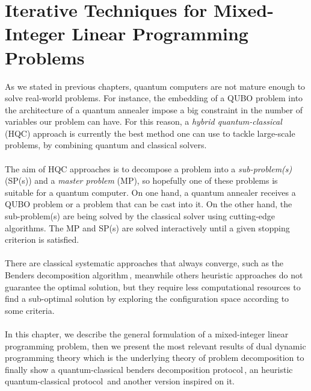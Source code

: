 
\chapter{Iterative Techniques for Mixed-Integer Linear Programming Problems} %

\label{Chapter3} %

As we stated in previous chapters, quantum computers are not mature enough to solve real-world problems. For instance, the embedding of a QUBO problem into the architecture of a quantum annealer impose a big constraint in the number of variables our problem can have. For this reason, a \textit{hybrid quantum-classical} (HQC) approach is currently the best method one can use to tackle large-scale problems, by combining quantum and classical solvers.\\\\
The aim of HQC approaches is to decompose a problem into a \textit{sub-problem(s)} (SP(s)) and a \textit{master problem} (MP), so hopefully one of these problems is suitable for a quantum computer. On one hand, a quantum annealer receives a QUBO problem or a problem that can be cast into it. On the other hand, the sub-problem(s) are being solved by the classical solver using cutting-edge algorithms. The MP and SP(s) are solved interactively until a given stopping criterion is satisfied. \\\\
There are classical systematic approaches that always converge, such as the Benders decomposition algorithm\,\cite{Sahinidis1991BDConvergence}, meanwhile others heuristic approaches do not guarantee the optimal solution, but they require less computational resources to find a sub-optimal solution by exploring the configuration space according to some criteria.\\\\
In this chapter, we describe the general formulation of a mixed-integer linear programming problem, then we present the most relevant results of dual dynamic programming theory which is the underlying theory of problem decomposition to finally show a quantum-classical benders decomposition protocol\,\cite{Zhao2021HybridProgramming}, an heuristic quantum-classical protocol\,\cite{Ding2019ImplementationDesign} and another version inspired on it.
